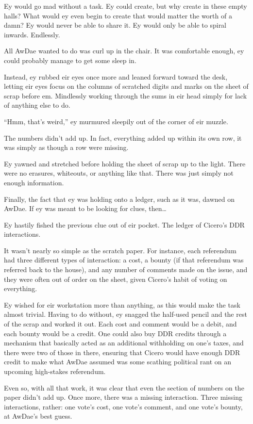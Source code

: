 Ey would go mad without a task.  Ey could create, but why create in these empty halls?  What would ey even begin to create that would matter the worth of a damn?  Ey would never be able to share it.  Ey would only be able to spiral inwards.  Endlessly.

All AwDae wanted to do was curl up in the chair.  It was comfortable enough, ey could probably manage to get some sleep in.

Instead, ey rubbed eir eyes once more and leaned forward toward the desk, letting eir eyes focus on the columns of scratched digits and marks on the sheet of scrap before em.  Mindlessly working through the sums in eir head simply for lack of anything else to do.

``Hmm, that's weird,'' ey murmured sleepily out of the corner of eir muzzle.

The numbers didn't add up.  In fact, everything added up  within its own row, it was simply as though a row were missing.

Ey yawned and stretched before holding the sheet of scrap up to the light.  There were no erasures, whiteouts, or anything like that.  There was just simply not enough information.

Finally, the fact that ey was holding onto a ledger, such as it was, dawned on AwDae.  If ey was meant to be looking for clues, then\ldots{}

Ey hastily fished the previous clue out of eir pocket.  The ledger of Cicero's DDR interactions.

It wasn't nearly so simple as the scratch paper.  For instance, each referendum had three different types of interaction: a cost, a bounty (if that referendum was referred back to the house), and any number of comments made on the issue, and they were often out of order on the sheet, given Cicero's habit of voting on everything.

Ey wished for eir workstation more than anything, as this would make the task almost trivial.  Having to do without, ey snagged the half-used pencil and the rest of the scrap and worked it out.  Each cost and comment would be a debit, and each bounty would be a credit.  One could also buy DDR credits through a mechanism that basically acted as an additional withholding on one's taxes, and there were two of those in there, ensuring that Cicero would have enough DDR credit to make what AwDae assumed was some scathing political rant on an upcoming high-stakes referendum.

Even so, with all that work, it was clear that even the section of numbers on the paper didn't add up.  Once more, there was a missing interaction.  Three missing interactions, rather: one vote's cost, one vote's comment, and one vote's bounty, at AwDae's best guess.

